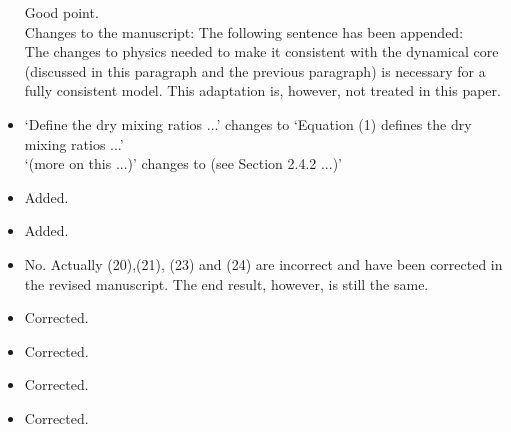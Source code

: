 \documentclass[11pt]{article}
\begin{document}
\begin{itemize}
Good point. \\

Changes to the manuscript: The following sentence has been appended:\\

The changes to physics needed to make it consistent with the dynamical core (discussed in this paragraph and the previous paragraph) is necessary for a fully consistent model. This adaptation is, however, not treated in this paper.

\item {\color{blue}{L129: The first sentence is a bit awkward to read. Why not ``Equation 1 defines ... `` L159: ``... (more on this ...) ``}}

`Define the dry mixing ratios ...' changes to `Equation (1) defines the dry mixing ratios ...'\\

`(more on this ...)' changes to (see Section 2.4.2 ...)'

\item {}

Added.

\item {}

Added. 

\item {\color{blue}{Is (26) correct.}}

No. Actually (20),(21), (23) and (24) are incorrect and have been corrected in the revised manuscript. The end result, however, is still the same.

\item {}

Corrected.

\item {}

Corrected.

\item {}

Corrected.

\item {\color{blue}{Eq.33-35: left hand side, 2nd term has wrong sign }}

Corrected.


\end{itemize}
\end{document}
